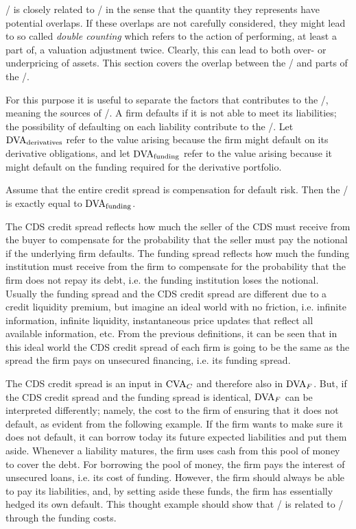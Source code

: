 \documentclass[main.tex]{subfiles}
\begin{document}
    \FVA/ is closely related to \DVA/ in the sense that the quantity they represents have potential overlaps.
    If these overlaps are not carefully considered, they might lead to so called \textit{double counting}
    which refers to the action of performing, at least a part of, a valuation adjustment twice. 
    Clearly, this can lead to both over- or underpricing of assets.
    This section covers the overlap between the \FVA/ and parts of the \DVA/.

    For this purpose it is useful to separate the factors that contributes to the \DVA/,
    meaning the sources of \DVA/. 
    A firm defaults if it is not able to meet its liabilities;
    the possibility of defaulting on each liability contribute to the \DVA/.
    Let $\DVA/_{\text{derivatives}}$ refer to the value arising
    because the firm might default on its derivative obligations,
    and let $\DVA/_{\text{funding}}$ refer to the value arising 
    because it might default on the funding required for the derivative portfolio.

    Assume that the entire credit spread is compensation for default risk.
    Then the \FBA/ is exactly equal to $\DVA/_{\text{funding}}$. 

    The CDS credit spread reflects how much the seller of the CDS must receive from the buyer
    to compensate for the probability that the seller must pay the notional if the underlying firm defaults.
    The funding spread reflects how much the funding institution must receive from the firm 
    to compensate for the probability that the firm does not repay its debt, 
    i.e. the funding institution loses the notional.
    Usually the funding spread and the CDS credit spread are different due to a credit liquidity premium,
    but imagine an ideal world with no friction, i.e. infinite information, infinite liquidity, 
    instantaneous price updates that reflect all available information, etc.
    From the previous definitions, it can be seen that in this ideal world
    the CDS credit spread of each firm is going to be the same 
    as the spread the firm pays on unsecured financing, i.e. its funding spread.

    The CDS credit spread is an input in $\CVA/_{C}$ and therefore also in $\DVA/_{F}$.
    But, if the CDS credit spread and the funding spread is identical, $\DVA/_{F}$ can be interpreted differently;
    namely, the cost to the firm of ensuring that it does not default, as evident from the following example.
    If the firm wants to make sure it does not default,
    it can borrow today its future expected liabilities and put them aside.
    Whenever a liability matures, the firm uses cash from this pool of money to cover the debt.
    For borrowing the pool of money, the firm pays the interest of unsecured loans, i.e. its cost of funding.
    However, the firm should always be able to pay its liabilities,
    and, by setting aside these funds, the firm has essentially hedged its own default. 
    This thought example should show that \DVA/ is related to \FVA/ through the funding costs.
    
\end{document}
